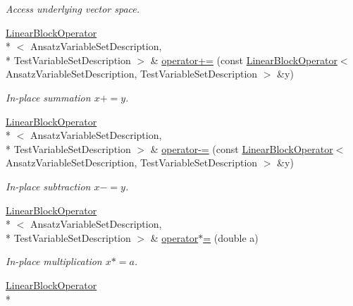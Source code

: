 \begin{DoxyCompactItemize}
\begin{DoxyCompactList}\small\item\em Access underlying vector space. \end{DoxyCompactList}\item 
\hyperlink{classSpacy_1_1KaskadeParabolic_1_1OCP_1_1LinearBlockOperator}{Linear\-Block\-Operator}\\*
$<$ Ansatz\-Variable\-Set\-Description, \\*
Test\-Variable\-Set\-Description $>$ \& \hyperlink{classSpacy_1_1AddArithmeticOperators_afad1d01e1e8c6f75290ac46d9b047ea8}{operator+=} (const \hyperlink{classSpacy_1_1KaskadeParabolic_1_1OCP_1_1LinearBlockOperator}{Linear\-Block\-Operator}$<$ Ansatz\-Variable\-Set\-Description, Test\-Variable\-Set\-Description $>$ \&y)
\begin{DoxyCompactList}\small\item\em In-\/place summation $ x+=y$. \end{DoxyCompactList}\item 
\hyperlink{classSpacy_1_1KaskadeParabolic_1_1OCP_1_1LinearBlockOperator}{Linear\-Block\-Operator}\\*
$<$ Ansatz\-Variable\-Set\-Description, \\*
Test\-Variable\-Set\-Description $>$ \& \hyperlink{classSpacy_1_1AddArithmeticOperators_a9fa91e177d13203cfe8cfa991c64ca36}{operator-\/=} (const \hyperlink{classSpacy_1_1KaskadeParabolic_1_1OCP_1_1LinearBlockOperator}{Linear\-Block\-Operator}$<$ Ansatz\-Variable\-Set\-Description, Test\-Variable\-Set\-Description $>$ \&y)
\begin{DoxyCompactList}\small\item\em In-\/place subtraction $ x-=y$. \end{DoxyCompactList}\item 
\hyperlink{classSpacy_1_1KaskadeParabolic_1_1OCP_1_1LinearBlockOperator}{Linear\-Block\-Operator}\\*
$<$ Ansatz\-Variable\-Set\-Description, \\*
Test\-Variable\-Set\-Description $>$ \& \hyperlink{classSpacy_1_1AddArithmeticOperators_a1d3db95b24fd2bc1de712c9e04c47e2f}{operator$\ast$=} (double a)
\begin{DoxyCompactList}\small\item\em In-\/place multiplication $ x*=a$. \end{DoxyCompactList}\item 
\hyperlink{classSpacy_1_1KaskadeParabolic_1_1OCP_1_1LinearBlockOperator}{Linear\-Block\-Operator}\\*

\end{DoxyCompactItemize}
